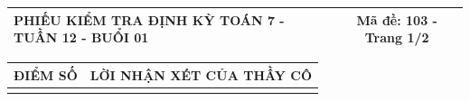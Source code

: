 \documentclass[12pt,a4paper]{article}
\begin{document}
\newpage
\noindent
\begin{tabularx}{\linewidth}{|X|c|}
\hline
\textbf{PHIẾU KIỂM TRA ĐỊNH KỲ TOÁN 7 - TUẦN 12 - BUỔI 01} & \textbf{Mã đề: 103 - Trang 1/2} \\
\hline
\end{tabularx}

\vspace{1.0mm}

\noindent
\begin{tabularx}{\linewidth}{|p{3.2cm}|X|}
\hline
\centering\textbf{ĐIỂM SỐ} & \centering\textbf{LỜI NHẬN XÉT CỦA THẦY CÔ} \tabularnewline
\hline
\rule{0pt}{1.8cm} & \tabularnewline
\hline
\end{tabularx}
\end{document}
